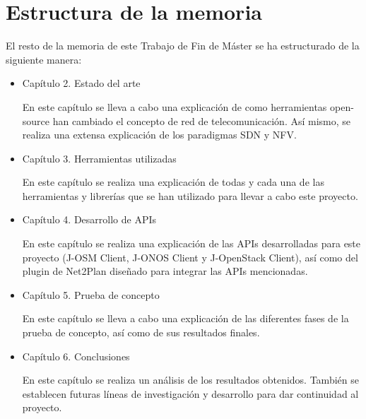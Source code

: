 \clearpage

\section{Estructura de la memoria}

El resto de la memoria de este Trabajo de Fin de Máster se ha estructurado de la siguiente manera:
\begin{itemize}

	
	\item Capítulo 2. Estado del arte
	
	En este capítulo se lleva a cabo una explicación de como herramientas open-source han cambiado el concepto de red de telecomunicación. Así mismo, se realiza una extensa explicación de los paradigmas \ac{SDN} y \ac{NFV}.
	
	\item Capítulo 3. Herramientas utilizadas
	
	En este capítulo se realiza una explicación de todas y cada una de las herramientas y librerías que se han utilizado para llevar a cabo este proyecto.
	
	\item Capítulo 4. Desarrollo de APIs
	
	En este capítulo se realiza una explicación de las \acp{API} desarrolladas para este proyecto (J-OSM Client, J-ONOS Client y J-OpenStack Client), así como del plugin de Net2Plan diseñado para integrar las \acp{API} mencionadas.
	
	\item Capítulo 5. Prueba de concepto
	
	En este capítulo se lleva a cabo una explicación de las diferentes fases de la prueba de concepto, así como de sus resultados finales.
	
	\item Capítulo 6. Conclusiones
	
	En este capítulo se realiza un análisis de los resultados obtenidos. También se establecen futuras líneas de investigación y desarrollo para dar continuidad al proyecto.
	
	
\end{itemize}
\cleardoublepage
	
